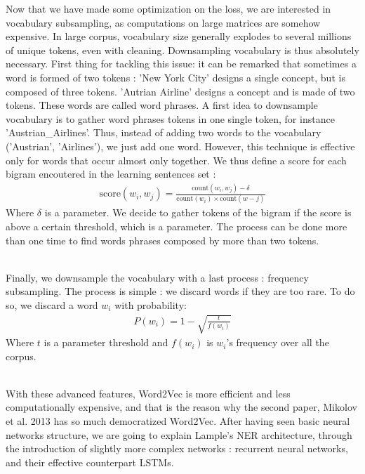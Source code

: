 \documentclass{article}
\begin{document}
Now that we have made some optimization on the loss, we are interested in vocabulary subsampling,
as computations on large matrices are somehow expensive. In large corpus, vocabulary size generally 
explodes to several millions of unique tokens, even with cleaning. Downsampling vocabulary is thus 
absolutely necessary. First thing for tackling this issue: 
 it can be remarked that sometimes a word is formed of two 
tokens : 'New York City' designs a single concept, but is composed of three tokens.
'Autrian Airline' designs a concept and is made of two tokens. These words are called word
phrases. 
A first idea to downsample vocabulary is to gather word phrases 
tokens in one single token, for instance 'Austrian\_Airlines'. Thus, instead of adding 
two words to the vocabulary ('Austrian', 'Airlines'), we just add one word. However, 
this technique is effective only for words that occur almost only together. We thus 
define a score for each bigram encoutered in the learning sentences set : 
\begin{align*}
    \text{score} (w_i, w_j) = \frac{\text{count}(w_i, w_j)- \delta}{\text{count}(w_i)
     \times \text{count}(w-j)}
\end{align*}
Where $\delta $ is a parameter. We decide to gather tokens of the bigram if 
the score is above a certain threshold, which is a parameter. The process can be 
done more than one time to find words phrases composed by more than two tokens. \\ \par

Finally, we downsample the vocabulary with a last process : frequency subsampling. 
The process is simple : we discard words if they are too rare. To do so, 
we discard a word $w_i$ with probability:
\begin{align*}
    P(w_i) = 1- \sqrt{\frac{t}{f(w_i)}}
\end{align*}
Where $t$ is a parameter threshold and $f(w_i)$ is $w_i$'s frequency over all the corpus. \\ \par

\noindent With these advanced features, Word2Vec is more efficient and less computationally expensive, 
and that is the reason why the second paper, 
Mikolov et al. 2013 \cite{NIPS2013_5021b} has so much democratized 
Word2Vec. After having seen basic neural networks structure, we are going to explain Lample's NER architecture, 
through the introduction of slightly more complex networks : recurrent neural networks, 
and their effective counterpart LSTMs. 
\end{document}
